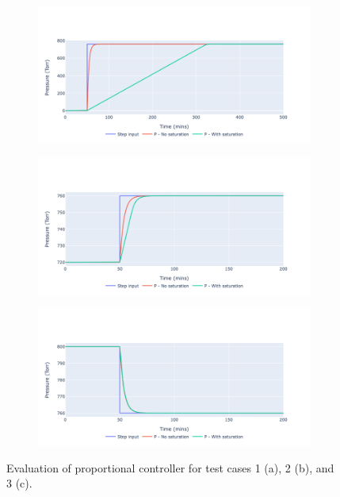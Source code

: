\begin{figure}[h!]
    \centering
    \begin{subfigure}{0.8\linewidth}
        \centering
        \includegraphics[width=\linewidth]{chapter_5/figures/test_1_kp.png}
        \caption{}
    \end{subfigure}
    \begin{subfigure}{0.8\linewidth}
        \centering
        \includegraphics[width=\linewidth]{chapter_5/figures/test_2_kp.png}
        \caption{}
    \end{subfigure}
   
    \bigskip
    \begin{subfigure}{0.8\linewidth}
        \centering
        \includegraphics[width=\linewidth]{chapter_5/figures/test_3_kp.png}
        \caption{}
    \end{subfigure}
    \caption{Evaluation of proportional controller for test cases 1 (a), 2 (b), and 3 (c).}
    \label{fig:kp_results_no_actuators}
\end{figure}

